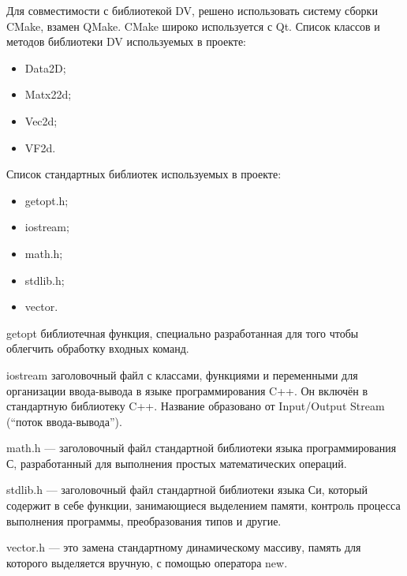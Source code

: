 Для совместимости с библиотекой DV, решено использовать систему сборки CMake, взамен QMake. CMake широко используется с Qt.
Список классов и методов библиотеки DV используемых в проекте:
\begin{itemize}
\item Data2D;
\item Matx22d;
\item Vec2d;
\item VF2d.
\end{itemize}

Список стандартных библиотек используемых в проекте:

\begin{itemize}
\item getopt.h;
\item iostream;
\item math.h;
\item stdlib.h;
\item vector.
\end{itemize}

getopt библиотечная функция, специально разработанная для того чтобы облегчить обработку входных команд. 

iostream заголовочный файл с классами, функциями и переменными для организации ввода-вывода в языке программирования C++. Он включён в стандартную библиотеку C++. Название образовано от Input/Output Stream (``поток ввода-вывода'').

math.h — заголовочный файл стандартной библиотеки языка программирования С, разработанный для выполнения простых математических операций.

stdlib.h — заголовочный файл стандартной библиотеки языка Си, который содержит в себе функции, занимающиеся выделением памяти, контроль процесса выполнения программы, преобразования типов и другие.

vector.h — это замена стандартному динамическому массиву, память для которого выделяется вручную, с помощью оператора new.